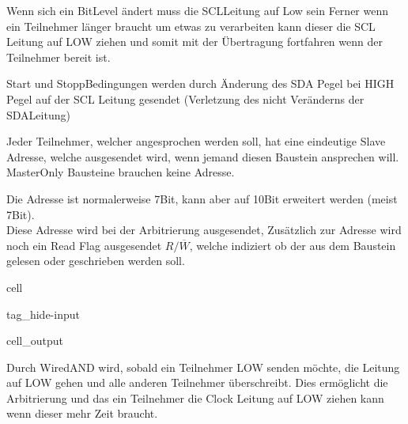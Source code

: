 \documentclass[letterpaper,10pt,english]{jupyterBook}
\begin{document}
\sphinxAtStartPar
Wenn sich ein Bit\sphinxhyphen{}Level ändert muss die SCL\sphinxhyphen{}Leitung auf Low sein
Ferner wenn ein Teilnehmer länger braucht um etwas zu verarbeiten kann dieser die SCL Leitung auf LOW ziehen
und somit mit der Übertragung fortfahren wenn der Teilnehmer bereit ist.

\sphinxAtStartPar
Start\sphinxhyphen{} und Stopp\sphinxhyphen{}Bedingungen werden durch Änderung des SDA Pegel bei HIGH Pegel auf der SCL Leitung gesendet (Verletzung des nicht Veränderns der SDA\sphinxhyphen{}Leitung)

\begin{DUlineblock}{0em}
\item[] 
\end{DUlineblock}

\sphinxAtStartPar
Jeder Teilnehmer, welcher angesprochen werden soll,
hat eine eindeutige Slave Adresse,
welche ausgesendet wird, wenn jemand diesen Baustein ansprechen will.
Master\sphinxhyphen{}Only Bausteine brauchen keine Adresse.

\sphinxAtStartPar
Die Adresse ist normalerweise 7\sphinxhyphen{}Bit, kann aber auf 10\sphinxhyphen{}Bit erweitert werden (meist 7\sphinxhyphen{}Bit).\\
Diese Adresse wird bei der Arbitrierung ausgesendet,
Zusätzlich zur Adresse wird noch ein Read Flag ausgesendet \(R/\overline{W}\),
welche indiziert ob der aus dem Baustein gelesen oder geschrieben werden soll.

\begin{sphinxuseclass}{cell}
\begin{sphinxuseclass}{tag_hide-input}\begin{sphinxVerbatimOutput}

\begin{sphinxuseclass}{cell_output}
\noindent{}

\end{sphinxuseclass}\end{sphinxVerbatimOutput}

\end{sphinxuseclass}
\end{sphinxuseclass}
\begin{DUlineblock}{0em}
\item[] 
\end{DUlineblock}

\sphinxAtStartPar
Durch Wired\sphinxhyphen{}AND wird, sobald ein Teilnehmer LOW senden möchte, die Leitung auf LOW gehen
und alle anderen Teilnehmer überschreibt.
Dies ermöglicht die Arbitrierung
und das ein Teilnehmer die Clock Leitung auf LOW ziehen kann wenn dieser mehr Zeit braucht.
\end{document}
